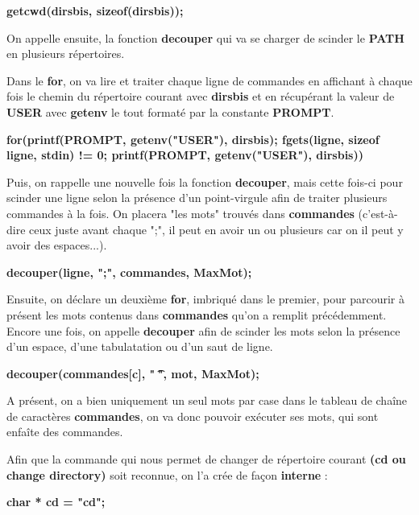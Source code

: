 \documentclass[11pt,a4paper]{report}
\begin{document}
\textbf{getcwd(dirsbis, sizeof(dirsbis));}\newline

On appelle ensuite, la fonction \textbf{decouper} qui va se charger de scinder le \textbf{PATH} en plusieurs répertoires.\newline
 
Dans le \textbf{for}, on va lire et traiter chaque ligne de commandes en affichant à chaque fois le chemin du répertoire courant avec \textbf{dirsbis} et en récupérant la valeur de \textbf{USER} avec \textbf{getenv} le tout formaté  par la constante \textbf{PROMPT}.\newline

\textbf{for(printf(PROMPT, getenv("USER"), dirsbis); fgets(ligne, sizeof ligne, stdin) != 0; printf(PROMPT, getenv("USER"), dirsbis))}\newline

Puis, on rappelle une nouvelle fois la fonction \textbf{decouper}, mais cette fois-ci pour scinder une ligne selon la présence d'un point-virgule afin de traiter plusieurs commandes à la fois. On placera "les mots" trouvés dans \textbf{commandes} (c'est-à-dire ceux juste avant chaque ";", il peut en avoir un ou plusieurs car on il peut y avoir des espaces...).\newline

\textbf{decouper(ligne, ";", commandes, MaxMot);}\newline

Ensuite, on déclare un deuxième \textbf{for}, imbriqué dans le premier, pour parcourir à présent les mots contenus dans \textbf{commandes} qu'on a remplit précédemment. Encore une fois, on appelle \textbf{decouper} afin de scinder les mots selon la présence d'un espace, d'une tabulatation ou d'un saut de ligne.\newline

\textbf{decouper(commandes[c], " \t\n", mot, MaxMot);}\newline

A présent, on a bien uniquement un seul mots par case dans le tableau de chaîne de caractères \textbf{commandes}, on va donc pouvoir exécuter ses mots, qui sont enfaîte des commandes.\newline

Afin que la commande qui nous permet de changer de répertoire courant \textbf{(cd ou change directory)} soit reconnue, on l'a crée de façon \textbf{interne} :\newline

\textbf{char * cd = "cd";}\newline
\end{document}
